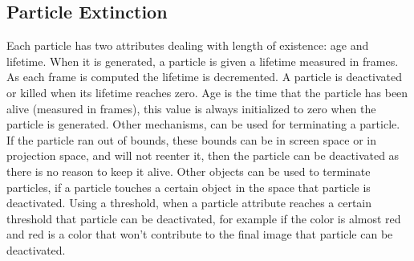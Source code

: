 \subsection{Particle Extinction}
Each particle has two attributes dealing with length of existence: age and lifetime. When it is generated, a particle is given a lifetime measured in frames. As each frame is computed the lifetime is decremented. A particle is deactivated or killed when its lifetime reaches zero. Age is the time that the particle has been alive (measured in frames), this value is always initialized to zero when the particle is generated. Other mechanisms, can be used for terminating a particle. If the particle ran out of bounds, these bounds can be in screen space or in projection space, and will not reenter it, then the particle can be deactivated as there is no reason to keep it alive. Other objects can be used to terminate particles, if a particle touches a certain object in the space that particle is deactivated. Using a threshold, when a particle attribute reaches a certain threshold that particle can be deactivated, for example if the color is almost red and red is a color that won't contribute to the final image that particle can be deactivated. 

